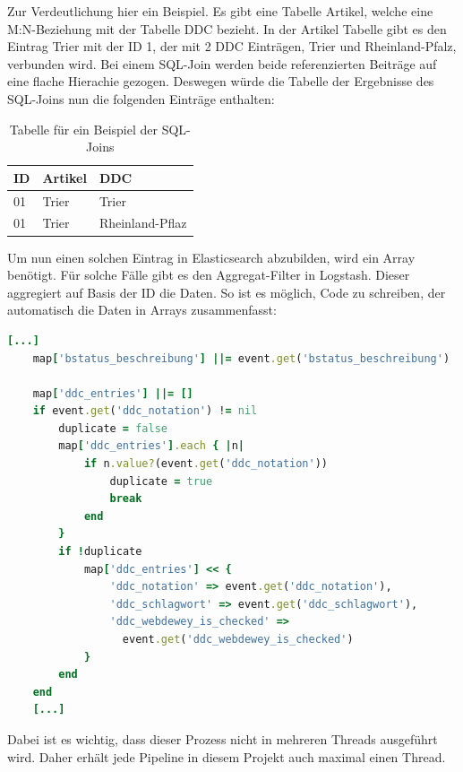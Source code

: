 Zur Verdeutlichung hier ein Beispiel.
Es gibt eine Tabelle Artikel, welche eine M:N-Beziehung mit der Tabelle DDC bezieht. In der Artikel Tabelle gibt es den Eintrag Trier mit der ID 1, der mit 2 DDC Einträgen, Trier und Rheinland-Pfalz, verbunden wird. Bei einem SQL-Join werden beide referenzierten Beiträge auf eine flache Hierachie gezogen. Deswegen würde die Tabelle der Ergebnisse des SQL-Joins nun die folgenden Einträge enthalten:

\begin{table} %
	\centering
		\begin{tabular}{l | l | l}
		    \textbf{ID} & \textbf{Artikel} & \textbf{DDC} \\
        \hline
        01 & Trier & Trier \\
        01 & Trier & Rheinland-Pflaz  \\
		\end{tabular}
    \caption{Tabelle für ein Beispiel der SQL-Joins}
    \label{tbl:join}
\end{table}

Um nun einen solchen Eintrag in Elasticsearch abzubilden, wird ein Array benötigt. Für solche Fälle gibt es den Aggregat-Filter in Logstash. Dieser aggregiert auf Basis der ID die Daten. So ist es möglich, Code zu schreiben, der automatisch die Daten in Arrays zusammenfasst:

\begin{lstlisting}[language=Ruby, frame=single, label={lst:fronendConf}, caption=Auschnitt aus dem Aggregat-Filter von Logstash,captionpos=b] 
    [...]
    map['bstatus_beschreibung'] ||= event.get('bstatus_beschreibung')
    
    map['ddc_entries'] ||= []
    if event.get('ddc_notation') != nil
        duplicate = false
        map['ddc_entries'].each { |n|
            if n.value?(event.get('ddc_notation'))
                duplicate = true
                break
            end
        }
        if !duplicate
            map['ddc_entries'] << {
                'ddc_notation' => event.get('ddc_notation'),
                'ddc_schlagwort' => event.get('ddc_schlagwort'),
                'ddc_webdewey_is_checked' => 
                  event.get('ddc_webdewey_is_checked')
            }
        end
    end
    [...]
    \end{lstlisting}

Dabei ist es wichtig, dass dieser Prozess nicht in mehreren Threads ausgeführt wird. Daher erhält jede Pipeline in diesem Projekt auch maximal einen Thread.

